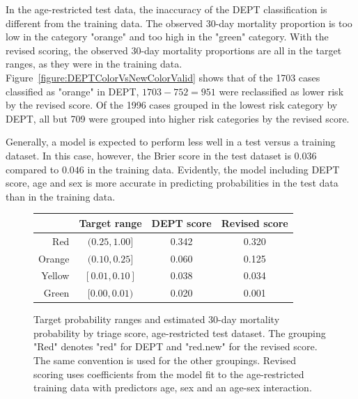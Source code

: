 In the age-restricted test data, the inaccuracy of the DEPT classification is different from the training data.  The observed 30-day mortality proportion is too low in the category "orange" and too high in the "green" category.  With the revised scoring, the observed 30-day mortality proportions are all in the target ranges, as they were in the training data.  Figure~\ref{figure:DEPTColorVsNewColorValid} shows that of the 1703 cases classified as "orange" in DEPT, $1703 - 752 = 951$ were reclassified as lower risk by the revised score.  Of the 1996 cases grouped in the lowest risk category by DEPT, all but 709 were grouped into higher risk categories by the revised score.

Generally, a model is expected to perform less well in a test versus a training dataset.  In this case, however, the Brier score in the test dataset is $0.036$ compared to $0.046$ in the training data.  Evidently, the model including DEPT score, age and sex is more accurate in predicting probabilities in the test data than in the training data. 



\begin{figure}[ht]
  \centering
  \begin{tabular}{rccc}
    \hline
    & Target range & DEPT score & Revised score \\
    \hline
    Red & $ (0.25, 1.00]$ & 0.342 & 0.320 \\
  Orange & $(0.10, 0.25]$ & 0.060 & 0.125 \\
  Yellow & $ [0.01, 0.10]$ & 0.038 & 0.034 \\
  Green & $ [0.00, 0.01)$ & 0.020 & 0.001 \\
   \hline
\end{tabular}
\caption{Target probability ranges and estimated 30-day mortality probability by triage score, age-restricted test dataset. The grouping "Red" denotes "red" for DEPT and "red.new" for the revised score.  The same convention is used for the other groupings. Revised scoring uses coefficients from the model fit to the age-restricted training data with predictors  age, sex and an age-sex interaction.}
\label{figure:mort30RatesByColorValid}
\end{figure}

